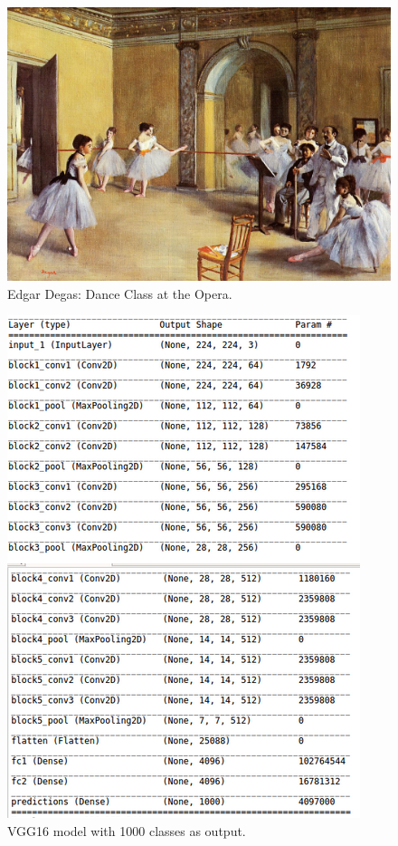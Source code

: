 \begin{figure}[H]
    \centering
    \includegraphics[scale=0.3]{Graphics/Assignment3/degas.png}
    \caption{Edgar Degas: Dance Class at the Opera.}
    \label{fig:degas}
\end{figure}


\begin{figure}[H]
    \centering
    \includegraphics[scale=0.7]{Graphics/Assignment3/VGG16_model_image.png}
    \caption{VGG16 model with 1000 classes as output.}
    \label{fig:imagenet_vgg16}
\end{figure}

